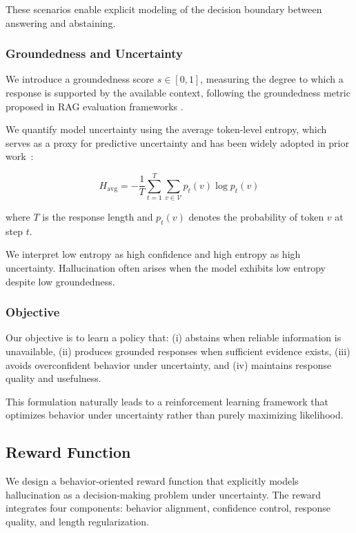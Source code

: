 These scenarios enable explicit modeling of the decision boundary between answering and abstaining.

\subsubsection{Groundedness and Uncertainty}

We introduce a groundedness score $s \in [0,1]$, measuring the degree to which a response is supported by the available context, following the groundedness metric proposed in RAG evaluation frameworks \cite{es2024ragas}.

We quantify model uncertainty using the average token-level entropy, which serves as a proxy for predictive uncertainty and has been widely adopted in prior work~\cite{farquhar2024detecting}:

\[
H_{\text{avg}} = -\frac{1}{T} \sum_{t=1}^{T} \sum_{v \in \mathcal{V}} p_t(v)\log p_t(v)
\]

where $T$ is the response length and $p_t(v)$ denotes the probability of token $v$ at step $t$.

We interpret low entropy as high confidence and high entropy as high uncertainty. 
Hallucination often arises when the model exhibits low entropy despite low groundedness.

\subsubsection{Objective}

Our objective is to learn a policy that:
(i) abstains when reliable information is unavailable, 
(ii) produces grounded responses when sufficient evidence exists, 
(iii) avoids overconfident behavior under uncertainty, and 
(iv) maintains response quality and usefulness.

This formulation naturally leads to a reinforcement learning framework that optimizes behavior under uncertainty rather than purely maximizing likelihood.


\subsection{Reward Function}

We design a behavior-oriented reward function that explicitly models hallucination as a decision-making problem under uncertainty. 
The reward integrates four components: behavior alignment, confidence control, response quality, and length regularization.

